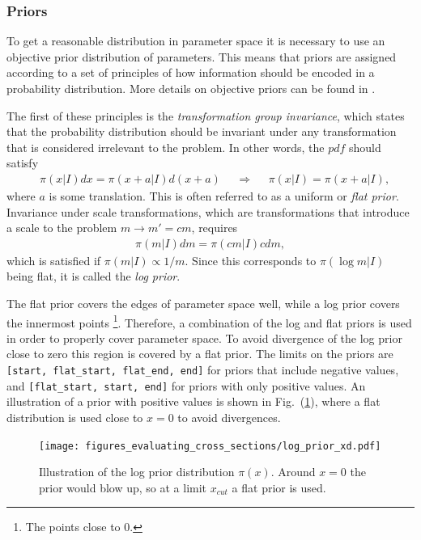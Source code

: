 \documentclass[twoside,english]{uiofysmaster}
\begin{document}
\subsubsection{Priors}

To get a reasonable distribution in parameter space it is necessary to use an objective prior distribution of parameters. This means that priors are assigned according to a set of principles of how information should be encoded in a probability distribution. More details on objective priors can be found in \cite{kvellestad2015chasing}.

The first of these principles is the \textit{transformation group invariance}, which states that the probability distribution should be invariant under any transformation that is considered irrelevant to the problem. In other words, the $pdf$ should satisfy
\begin{align}
&\pi (x|I) dx = \pi (x+a|I)d(x+a) &&\Rightarrow &&\pi (x|I) = \pi (x+a|I) ,
\end{align}
where $a$ is some translation. This is often referred to as a uniform or \textit{flat prior}. Invariance under scale transformations, which are transformations that introduce a scale to the problem $m \rightarrow m' = cm$, requires
\begin{align}
\pi (m | I) dm = \pi (cm|I) c dm,
\end{align}
which is satisfied if $\pi (m |I) \propto 1/m$. Since this corresponds to $\pi (\log m | I)$ being flat, it is called the \textit{log prior}. 

The flat prior covers the edges of parameter space well, while a log prior covers the innermost points \footnote{The points close to 0.}. Therefore, a combination of the log and flat priors is used in order to properly cover parameter space. To avoid divergence of the log prior close to zero this region is covered by a flat prior. The limits on the priors are \verb|[start, flat_start, flat_end, end]| for priors that include negative values, and \verb|[flat_start, start, end]| for priors with only positive values. An illustration of a prior with positive values is shown in Fig.\ (\ref{Fig:: evaluating cross : prior illustration}), where a flat distribution is used close to $x=0$ to avoid divergences.

\begin{figure}
\centering
\texttt{[image: figures\_evaluating\_cross\_sections/log\_prior\_xd.pdf]}
\caption{Illustration of the log prior distribution $\pi(x)$. Around $x=0$ the prior would blow up, so at a limit $x_{cut}$ a flat prior is used.}
\label{Fig:: evaluating cross : prior illustration}
\end{figure}
\end{document}
